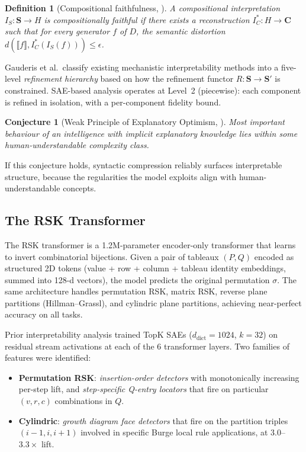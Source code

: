 \documentclass[10pt]{article}
\newtheorem{definition}{Definition}
\newtheorem{conjecture}{Conjecture}
\begin{document}
\begin{definition}[Compositional faithfulness, {\citep[Def.~3.1]{gauderis2026}}]
A compositional interpretation $I_S : \mathbf{S} \to H$ is
\emph{compositionally faithful} if there exists a reconstruction
$I_C^* : H \to \mathbf{C}$ such that for every generator $f$ of $D$,
the semantic distortion
$d(\llbracket f \rrbracket, I_C^*(I_S(f))) \leq \epsilon$.
\end{definition}

Gauderis et al.\ classify existing mechanistic interpretability methods into
a five-level \emph{refinement hierarchy} based on how the refinement functor
$R : \mathbf{S} \to \mathbf{S}'$ is constrained. SAE-based analysis operates
at Level~2 (piecewise): each component is refined in isolation, with a
per-component fidelity bound.

\begin{conjecture}[Weak Principle of Explanatory Optimism,
{\citep[Conj.~4.3]{gauderis2026}}]
Most important behaviour of an intelligence with implicit explanatory
knowledge lies within some human-understandable complexity class.
\end{conjecture}

If this conjecture holds, syntactic compression reliably surfaces
interpretable structure, because the regularities the model exploits align
with human-understandable concepts.

\subsection{The RSK Transformer}

The RSK transformer \citep{langer2026rsk} is a 1.2M-parameter encoder-only
transformer that learns to invert combinatorial bijections. Given a pair of
tableaux $(P, Q)$ encoded as structured 2D tokens (value + row + column +
tableau identity embeddings, summed into 128-d vectors), the model predicts
the original permutation $\sigma$. The same architecture handles permutation
RSK, matrix RSK, reverse plane partitions (Hillman--Grassl), and cylindric
plane partitions, achieving near-perfect accuracy on all tasks.

Prior interpretability analysis trained TopK SAEs ($d_{\text{dict}} = 1024$,
$k = 32$) on residual stream activations at each of the 6 transformer layers.
Two families of features were identified:

\begin{itemize}
\item \textbf{Permutation RSK}: \emph{insertion-order detectors} with
monotonically increasing per-step lift, and \emph{step-specific Q-entry
locators} that fire on particular $(v, r, c)$ combinations in $Q$.

\item \textbf{Cylindric}: \emph{growth diagram face detectors} that fire on
the partition triples $(i{-}1, i, i{+}1)$ involved in specific Burge local
rule applications, at $3.0$--$3.3\times$ lift.
\end{itemize}
\end{document}
